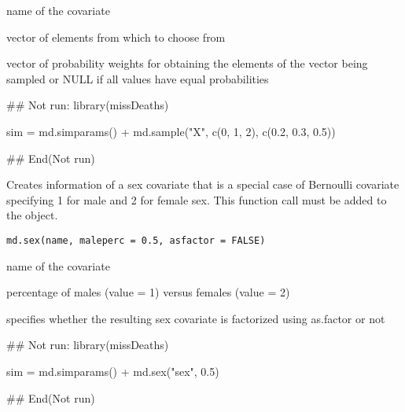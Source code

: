 \documentclass[a4paper]{book}
\begin{document}
%
\begin{Arguments}
\begin{ldescription}
\item[\code{name}] name of the covariate

\item[\code{array}] vector of elements from which to choose from

\item[\code{weights}] vector of probability weights for obtaining the elements of the vector being sampled or NULL if all values have equal probabilities
\end{ldescription}
\end{Arguments}
%
\begin{Examples}
\begin{ExampleCode}

## Not run: 
library(missDeaths)

sim = md.simparams() +
   md.sample("X", c(0, 1, 2), c(0.2, 0.3, 0.5)) 

## End(Not run)
\end{ExampleCode}
\end{Examples}
%
\begin{Description}\relax
Creates information of a sex covariate that is a special case of Bernoulli covariate
specifying 1 for male and 2 for female sex. 
This function call must be added to the  object.
\end{Description}
%
\begin{Usage}
\begin{verbatim}
md.sex(name, maleperc = 0.5, asfactor = FALSE)
\end{verbatim}
\end{Usage}
%
\begin{Arguments}
\begin{ldescription}
\item[\code{name}] name of the covariate

\item[\code{maleperc}] percentage of males (value = 1) versus females (value = 2)

\item[\code{asfactor}] specifies whether the resulting sex covariate is factorized using as.factor or not
\end{ldescription}
\end{Arguments}
%
\begin{Examples}
\begin{ExampleCode}

## Not run: 
library(missDeaths)

sim = md.simparams() +
   md.sex("sex", 0.5)

## End(Not run)

\end{ExampleCode}
\end{Examples}
\end{document}
